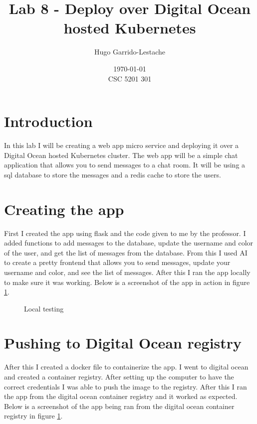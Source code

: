 \documentclass[12pt]{Article}
\title{Lab 8 - Deploy over Digital Ocean hosted Kubernetes}
\author{
    Hugo Garrido-Lestache
}
\date{\today \\ CSC 5201 301}
\begin{document}
\maketitle
\section*{Introduction}
In this lab I will be creating a web app micro service and deploying it over a Digital Ocean hosted Kubernetes cluster.
The web app will be a simple chat application that allows you to send messages to a chat room.
It will be using a sql database to store the messages and a redis cache to store the users.

\section{Creating the app}
First I created the app using flask and the code given to me by the professor.
I added functions to add messages to the database, update the username and color of the user, and get the list of messages from the database.   
From this I used AI to create a pretty frontend that allows you to send messages, update your username and color, and see the list of messages. 
After this I ran the app locally to make sure it was working.
Below is a screenshot of the app in action in figure \ref{fig:app}.

\begin{figure}[H]
    \centering
    \caption{Local testing}
    \label{fig:app}
\end{figure}

\section{Pushing to Digital Ocean registry}
After this I created a docker file to containerize the app.
I went to digital ocean and created a container registry.
After setting up the computer to have the correct credentials I was able to push the image to the registry.
After this I ran the app from the digital ocean container registry and it worked as expected.
Below is a screenshot of the app being ran from the digital ocean container registry in figure \ref{fig:app}.
\end{document}
